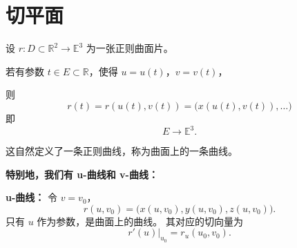 \documentclass[lang=cn,10pt,thmcnt=section]{elegantbook}
\begin{document}
\section{切平面}
\begin{definition}[曲面上的曲线]
    设 $r: D \subset \mathbb{R}^2 \rightarrow \mathbb{E}^3$ 为一张正则曲面片。
    
    若有参数 $t \in E \subset \mathbb{R}$，使得 $u = u(t)$，$v = v(t)$，
    
    则
    $$
    r(t) = r(u(t), v(t)) = \big(x(u(t), v(t)), \ldots\big)
    $$
    即
    $$
    E \longrightarrow \mathbb{E}^3.
    $$
    
    这自然定义了一条正则曲线，称为曲面上的一条曲线。
    \end{definition}     
    \textbf{特别地，我们有 u-曲线和 v-曲线：}

    \textbf{u-曲线：} 令 $v = v_0$，
    $$
    r(u, v_0) = \big(x(u, v_0), y(u, v_0), z(u, v_0)\big).
    $$
    只有 $u$ 作为参数，是曲面上的曲线。
    其对应的切向量为
    $$
    \left. r'(u) \right|_{u_0} = r_u(u_0, v_0).
    $$
    
\end{document}
